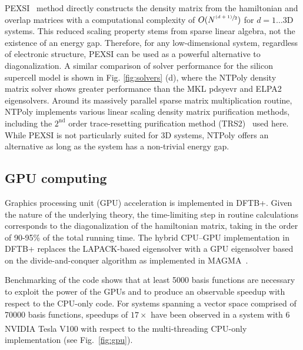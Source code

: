 \documentclass[reprint,onecolumn,superscriptaddress]{revtex4-1}
\newcommand{\dftbp}{DFTB+}
\begin{document}
PEXSI~\cite{pexsi_lin_2013} method directly constructs the density matrix from
the hamiltonian and overlap matrices with a computational complexity of
$O(N^{\sfrac{(d+1)}{2}})$ for $d=1\ldots3$D systems. This reduced scaling
property stems from sparse linear algebra, not the existence of an energy
gap. Therefore, for any low-dimensional system, regardless of electronic
structure, PEXSI can be used as a powerful alternative to diagonalization. A
similar comparison of solver performance for the silicon supercell model is
shown in Fig. \ref{fig:solvers} (d), where the NTPoly density matrix solver
shows greater performance than the MKL pdsyevr and ELPA2 eigensolvers. Around
its massively parallel sparse matrix multiplication routine, NTPoly implements
various linear scaling density matrix purification methods, including the
$2^\text{nd}$ order trace-resetting purification method
(TRS2)~\cite{ANiklasson02} used here. While PEXSI is not
particularly suited for 3D systems, NTPoly offers an alternative as long as the
system has a non-trivial energy gap.

\subsection{GPU computing}

Graphics processing unit (GPU) acceleration is implemented in \dftbp{}. Given
the nature of the underlying theory, the time-limiting step in routine
calculations corresponds to the diagonalization of the hamiltonian matrix,
taking in the order of 90-95\% of the total running time. The hybrid CPU--GPU
implementation in \dftbp{} replaces the LAPACK-based eigensolver with a GPU
eigensolver based on the divide-and-conquer algorithm as implemented in
MAGMA~\cite{TOMOV2010232}.

Benchmarking of the code shows that at least 5000 basis functions are necessary
to exploit the power of the GPUs and to produce an observable speedup with
respect to the CPU-only code. For systems spanning a vector space comprised of
70000 basis functions, speedups of $17\times$ have been observed in a system
with 6 NVIDIA\textsuperscript{\textregistered}
Tesla\textsuperscript{\textregistered} V100 with respect to the multi-threading
CPU-only implementation (see Fig.~\ref{fig:gpu}).
\end{document}
